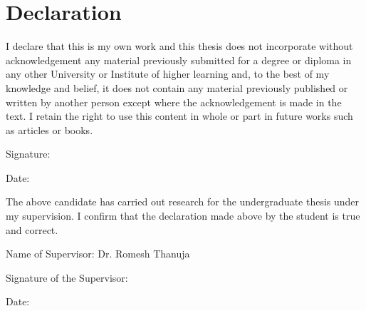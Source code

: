\section*{Declaration}


I declare that this is my own work and this thesis does not incorporate without acknowledgement any material previously submitted for a degree or diploma in any other University or Institute of higher learning and, to the best of my knowledge and belief, it does not contain any material previously published or written by another person except where the acknowledgement is made in the text. I retain the right to use this content in whole or part in future works such as articles or books.


Signature:


Date:


The above candidate has carried out research for the undergraduate thesis under my supervision. I confirm that the declaration made above by the student is true and correct.


Name of Supervisor: Dr. Romesh Thanuja


Signature of the Supervisor:


Date:
